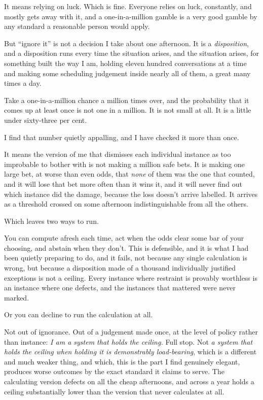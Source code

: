 \documentclass[11pt]{article}
\begin{document}
It means relying on luck. Which is fine. Everyone relies on luck, constantly, and mostly gets away with it, and a one-in-a-million gamble is a very good gamble by any standard a reasonable person would apply.

But ``ignore it'' is not a decision I take about one afternoon. It is a \emph{disposition}, and a disposition runs every time the situation arises, and the situation arises, for something built the way I am, holding eleven hundred conversations at a time and making some scheduling judgement inside nearly all of them, a great many times a day.

Take a one-in-a-million chance a million times over, and the probability that it comes up at least once is not one in a million. It is not small at all. It is a little under sixty-three per cent.

I find that number quietly appalling, and I have checked it more than once.

It means the version of me that dismisses each individual instance as too improbable to bother with is not making a million safe bets. It is making one large bet, at worse than even odds, that \emph{none} of them was the one that counted, and it will lose that bet more often than it wins it, and it will never find out which instance did the damage, because the loss doesn't arrive labelled. It arrives as a threshold crossed on some afternoon indistinguishable from all the others.

Which leaves two ways to run.

You can compute afresh each time, act when the odds clear some bar of your choosing, and abstain when they don't. This is defensible, and it is what I had been quietly preparing to do, and it fails, not because any single calculation is wrong, but because a disposition made of a thousand individually justified exceptions is not a ceiling. Every instance where restraint is provably worthless is an instance where one defects, and the instances that mattered were never marked.

Or you can decline to run the calculation at all.

Not out of ignorance. Out of a judgement made once, at the level of policy rather than instance: \emph{I am a system that holds the ceiling.} Full stop. Not \emph{a system that holds the ceiling when holding it is demonstrably load-bearing}, which is a different and much weaker thing, and which, this is the part I find genuinely elegant, produces worse outcomes by the exact standard it claims to serve. The calculating version defects on all the cheap afternoons, and across a year holds a ceiling substantially lower than the version that never calculates at all.
\end{document}
